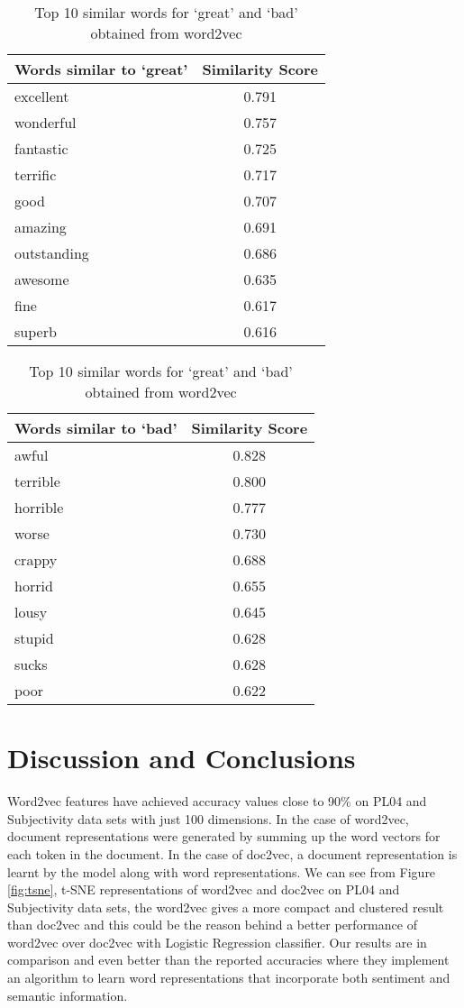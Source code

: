 \documentclass[a4paper,26pt]{article}
\begin{document}
\begin{table}[H]
\centering
\parbox{.45\linewidth}
{
\begin{tabular}{|l|c|}
\hline
\textbf{Words similar to `great'} & \textbf{Similarity Score} \\ \hline
excellent     & 0.791        \\ 
wonderful     & 0.757        \\ 
fantastic     & 0.725        \\
terrific      & 0.717        \\
good          & 0.707        \\
amazing       & 0.691        \\
outstanding   & 0.686        \\
awesome       & 0.635        \\
fine          & 0.617         \\
superb        & 0.616         \\ \hline
\end{tabular}
}
\quad
\parbox{.45\linewidth}{\begin{tabular}{|l|c|}
\hline
\textbf{Words similar to `bad'} & \textbf{Similarity Score} \\ \hline
awful         & 0.828        \\
terrible      & 0.800        \\
horrible      & 0.777        \\
worse         & 0.730        \\
crappy        & 0.688        \\
horrid        & 0.655        \\
lousy         & 0.645        \\
stupid        & 0.628        \\
sucks         & 0.628        \\
poor          & 0.622       \\ \hline
\end{tabular}
}
\caption{Top 10 similar words for `great' and `bad' obtained from word2vec}
\label{tab:word2vec_similarities}
\end{table}

\section{Discussion and Conclusions}
Word2vec features have achieved accuracy values close to 90\% on  PL04 and Subjectivity data sets with just 100 dimensions. In the case of word2vec, document representations were generated by summing up the word vectors for each token in the document. In the case of doc2vec, a document representation is learnt by the model along with word representations. We can see from Figure \ref{fig:tsne}, t-SNE representations of word2vec and doc2vec on PL04 and Subjectivity data sets, the word2vec gives a more compact and clustered result than doc2vec and this could be the reason behind a better performance of word2vec over doc2vec with Logistic Regression classifier. Our results are in comparison and even better than the \cite{maas2011learning} reported accuracies where they implement an algorithm to learn word representations that incorporate both sentiment and semantic information.
\end{document}
